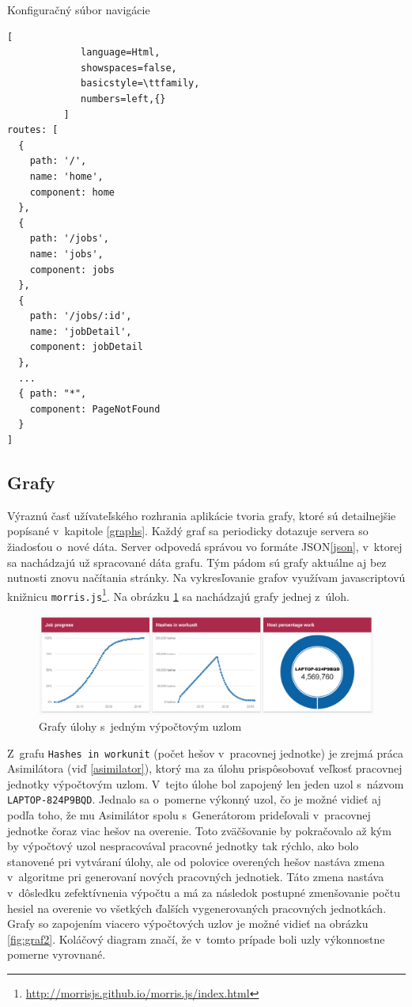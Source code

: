 \documentclass[slovak]{fitthesis}
\begin{document}
\begin{algorithm}[H]
  \caption{Konfiguračný súbor navigácie}
  \label{routerConfig}
  \begin{lstlisting}[
             language=Html,
             showspaces=false,
             basicstyle=\ttfamily,
             numbers=left,{}
          ]
routes: [
  {
    path: '/',
    name: 'home',
    component: home
  },
  {
    path: '/jobs',
    name: 'jobs',
    component: jobs
  },
  {
    path: '/jobs/:id',
    name: 'jobDetail',
    component: jobDetail
  },
  ...
  { path: "*",
    component: PageNotFound
  }
]
  \end{lstlisting}
\end{algorithm}


\subsection{Grafy}
Výraznú časť užívateľského rozhrania aplikácie tvoria grafy, ktoré sú detailnejšie popísané v~kapitole \ref{graphs}. Každý graf sa periodicky dotazuje servera so žiadosťou o~nové dáta. Server odpovedá správou vo formáte JSON\ref{json}, v~ktorej sa nachádzajú už spracované dáta grafu. Tým pádom sú grafy aktuálne aj bez nutnosti znovu načítania stránky. Na vykresľovanie grafov využívam javascriptovú knižnicu \texttt{morris.js}\footnote{\url{http://morrisjs.github.io/morris.js/index.html}}. Na obrázku \ref{fig:graf1} sa nachádzajú grafy jednej z~úloh.
\begin{figure}[H]
    \centering
    \includegraphics[scale=0.53]{obrazky/graf1.PNG}
    \caption{Grafy úlohy s~jedným výpočtovým uzlom}
    \label{fig:graf1}
\end{figure} 
Z~grafu \texttt{Hashes in workunit} (počet hešov v~pracovnej jednotke) je zrejmá práca Asimilátora (viď \ref{asimilator}), ktorý ma za úlohu prispôsobovať veľkosť pracovnej jednotky výpočtovým uzlom. V~tejto úlohe bol zapojený len jeden uzol s~názvom \texttt{LAPTOP-824P9BQD}. Jednalo sa o~pomerne výkonný uzol, čo je možné vidieť aj podľa toho, že mu Asimilátor spolu s~Generátorom prideľovali v~pracovnej jednotke čoraz viac hešov na overenie. Toto zväčšovanie by pokračovalo až kým by výpočtový uzol nespracovával pracovné jednotky tak rýchlo, ako bolo stanovené pri vytváraní úlohy, ale od polovice overených hešov nastáva zmena v~algoritme pri generovaní nových pracovných jednotiek. Táto zmena nastáva v~dôsledku zefektívnenia výpočtu a má za následok postupné zmenšovanie počtu hesiel na overenie vo všetkých ďalších vygenerovaných pracovných jednotkách.  Grafy so zapojením viacero výpočtových uzlov je možné vidieť na obrázku \ref{fig:graf2}. Koláčový diagram značí, že v~tomto prípade boli uzly výkonnostne pomerne vyrovnané. 
\end{document}
